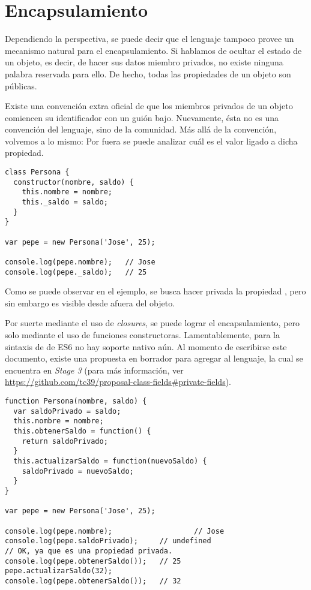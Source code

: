 \section{Encapsulamiento}

Dependiendo la perspectiva, se puede decir que el lenguaje tampoco provee un mecanismo natural para el encapsulamiento. Si hablamos de ocultar el estado de un objeto, es decir, de hacer sus datos miembro privados, no existe ninguna palabra reservada para ello. De hecho, todas las propiedades de un objeto son públicas.

Existe una convención extra oficial de que los miembros privados de un objeto comiencen su identificador con un guión bajo. Nuevamente, ésta no es una convención del lenguaje, sino de la comunidad. Más allá de la convención, volvemos a lo mismo: Por fuera se puede analizar cuál es el valor ligado a dicha propiedad.

\begin{lstlisting}[title={Descubriendo variables "`privadas"'}]
class Persona {
  constructor(nombre, saldo) {
    this.nombre = nombre;
    this._saldo = saldo;
  }
}

var pepe = new Persona('Jose', 25);

console.log(pepe.nombre);	// Jose
console.log(pepe._saldo);	// 25
\end{lstlisting}

Como se puede observar en el ejemplo, se busca hacer privada la propiedad , pero sin embargo es visible desde afuera del objeto.

Por suerte mediante el uso de \textit{closures}, se puede lograr el encapsulamiento, pero solo mediante el uso de funciones constructoras. Lamentablemente, para la sintaxis de  de ES6 no hay soporte nativo aún. Al momento de escribirse este documento, existe una propuesta en borrador para agregar al lenguaje, la cual se encuentra en \textit{Stage 3} (para más información, ver \href{https://github.com/tc39/proposal-class-fields#private-fields}{https://github.com/tc39/proposal-class-fields\#private-fields}).

\begin{lstlisting}[title={Alcanzando variables privadas mediante closures}]
function Persona(nombre, saldo) {
  var saldoPrivado = saldo;
  this.nombre = nombre;
  this.obtenerSaldo = function() {
    return saldoPrivado;
  }
  this.actualizarSaldo = function(nuevoSaldo) {
    saldoPrivado = nuevoSaldo;
  }
}

var pepe = new Persona('Jose', 25);

console.log(pepe.nombre);					// Jose
console.log(pepe.saldoPrivado);		// undefined
// OK, ya que es una propiedad privada.
console.log(pepe.obtenerSaldo());	// 25
pepe.actualizarSaldo(32);
console.log(pepe.obtenerSaldo());	// 32
\end{lstlisting}

